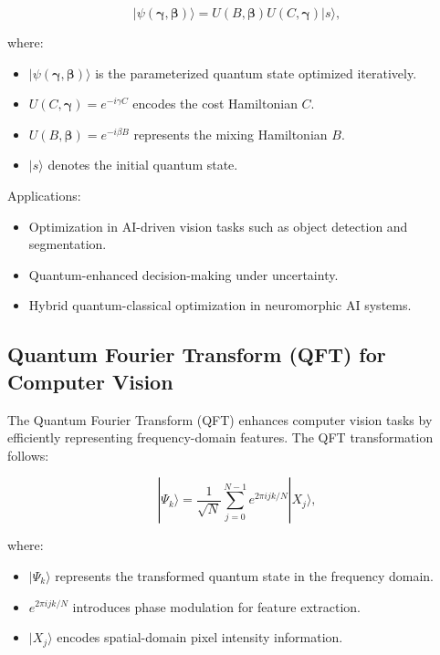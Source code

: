 \documentclass{article}
\theoremstyle{plain}
\begin{document}
\begin{equation}
|\psi(\boldsymbol{\gamma}, \boldsymbol{\beta})\rangle = U(B, \boldsymbol{\beta}) U(C, \boldsymbol{\gamma}) |s\rangle,
\end{equation}

where:
\begin{itemize}
    \item $|\psi(\boldsymbol{\gamma}, \boldsymbol{\beta})\rangle$ is the parameterized quantum state optimized iteratively.
    \item $U(C, \boldsymbol{\gamma}) = e^{-i \gamma C}$ encodes the cost Hamiltonian $C$.
    \item $U(B, \boldsymbol{\beta}) = e^{-i \beta B}$ represents the mixing Hamiltonian $B$.
    \item $|s\rangle$ denotes the initial quantum state.
\end{itemize}

Applications:
\begin{itemize}
    \item Optimization in AI-driven vision tasks such as object detection and segmentation.
    \item Quantum-enhanced decision-making under uncertainty.
    \item Hybrid quantum-classical optimization in neuromorphic AI systems.
\end{itemize}

\subsection{Quantum Fourier Transform (QFT) for Computer Vision}

The Quantum Fourier Transform (QFT) enhances computer vision tasks by efficiently representing frequency-domain features. The QFT transformation follows:

\begin{equation}
|\Psi_k\rangle = \frac{1}{\sqrt{N}} \sum_{j=0}^{N-1} e^{2\pi i jk / N} |X_j\rangle,
\end{equation}

where:
\begin{itemize}
    \item $|\Psi_k\rangle$ represents the transformed quantum state in the frequency domain.
    \item $e^{2\pi i jk / N}$ introduces phase modulation for feature extraction.
    \item $|X_j\rangle$ encodes spatial-domain pixel intensity information.
\end{itemize}
\end{document}
